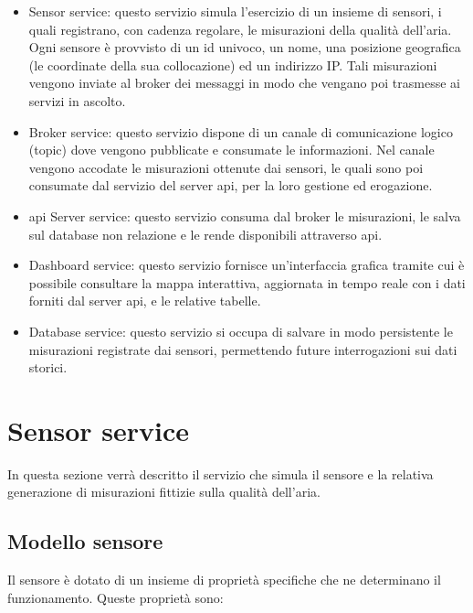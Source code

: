 \begin{itemize}
  \item Sensor service: questo servizio simula l'esercizio di un insieme di sensori, i quali registrano,
        con cadenza regolare, le misurazioni della qualità dell'aria. Ogni sensore è provvisto di un id univoco,
        un nome, una posizione geografica (le coordinate della sua collocazione) ed un indirizzo IP.
        Tali misurazioni vengono inviate al broker dei messaggi in modo che vengano poi trasmesse ai servizi in ascolto.
  \item Broker service: questo servizio dispone di un canale di comunicazione logico (topic)
        dove vengono pubblicate e consumate le informazioni. Nel canale vengono accodate le misurazioni
        ottenute dai sensori, le quali sono poi consumate dal servizio del server \acrshort{api},
        per la loro gestione ed erogazione.
  \item \acrshort{api} Server service: questo servizio consuma dal broker le misurazioni, le salva
        sul database non relazione e le rende disponibili attraverso \acrshort{api}.
  \item Dashboard service: questo servizio fornisce un'interfaccia grafica tramite cui è possibile consultare
        la mappa interattiva, aggiornata in tempo reale con i dati forniti dal server \acrshort{api}, e le relative
        tabelle.
  \item Database service: questo servizio si occupa di salvare in modo persistente le misurazioni
        registrate dai sensori, permettendo future interrogazioni sui dati storici.
\end{itemize}

\section{Sensor service}

In questa sezione verrà descritto il servizio che simula il sensore e la relativa generazione di misurazioni fittizie
sulla qualità dell'aria.

\subsection{Modello sensore}

Il sensore è dotato di un insieme di proprietà specifiche che ne determinano il funzionamento.
Queste proprietà sono:

